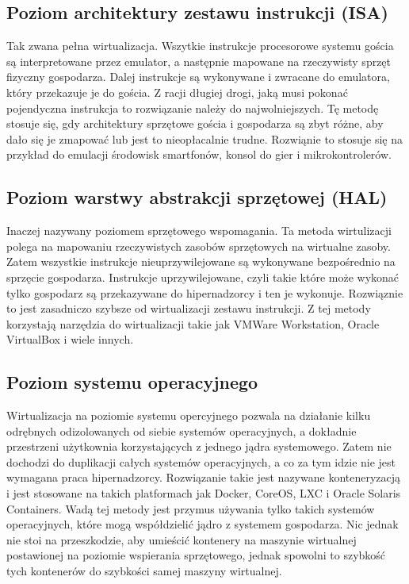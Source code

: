 \documentclass[polish, a4paper, 12pt, oneside]{book}
\begin{document}
\subsection {Poziom architektury zestawu instrukcji (ISA)}
Tak zwana pełna wirtualizacja. Wszytkie instrukcje procesorowe systemu gościa są interpretowane przez emulator, a następnie mapowane na rzeczywisty sprzęt fizyczny gospodarza. Dalej instrukcje są wykonywane i zwracane do emulatora, który przekazuje je do gościa. Z racji długiej drogi, jaką musi pokonać pojendyczna instrukcja to rozwiązanie należy do najwolniejszych. Tę metodę stosuje się, gdy architektury sprzętowe gościa i gospodarza są zbyt różne, aby dało się je zmapować lub jest to nieopłacalnie trudne. Rozwiąnie to stosuje się na przykład do emulacji środowisk smartfonów, konsol do gier i mikrokontrolerów.
\subsection {Poziom warstwy abstrakcji sprzętowej (HAL)}
Inaczej nazywany poziomem sprzętowego wspomagania. Ta metoda wirtulizacji polega na mapowaniu rzeczywistych zasobów sprzętowych na wirtualne zasoby. Zatem wszystkie instrukcje nieuprzywilejowane są wykonywane bezpośrednio na sprzęcie gospodarza. Instrukcje uprzywilejowane, czyli takie które może wykonać tylko gospodarz są przekazywane do hipernadzorcy i ten je wykonuje. Rozwiąznie to jest zasadniczo szybsze od wirtualizacji zestawu instrukcji. Z tej metody korzystają narzędzia do wirtualizacji takie jak VMWare Workstation, Oracle VirtualBox i wiele innych.
\subsection {Poziom systemu operacyjnego}
Wirtualizacja na poziomie systemu opercyjnego pozwala na działanie kilku odrębnych odizolowanych od siebie systemów operacyjnych, a dokładnie przestrzeni użytkownia korzystających z jednego jądra systemowego. Zatem nie dochodzi do duplikacji całych systemów operacyjnych, a co za tym idzie nie jest wymagana praca hipernadzorcy. Rozwiązanie takie jest nazywane konteneryzacją i jest stosowane na takich platformach jak Docker, CoreOS, LXC i Oracle Solaris Containers. Wadą tej metody jest przymus używania tylko takich systemów operacyjnych, które mogą współdzielić jądro z systemem gospodarza. Nic jednak nie stoi na przeszkodzie, aby umieścić kontenery na maszynie wirtualnej postawionej na poziomie wspierania sprzętowego, jednak spowolni to szybkość tych kontenerów do szybkości samej maszyny wirtualnej. 
\end{document}
